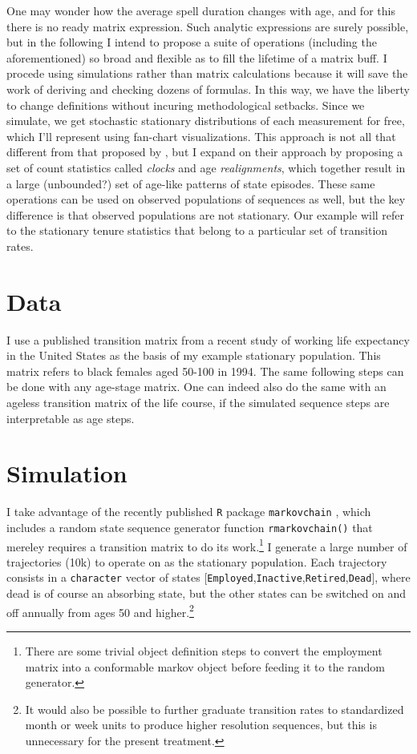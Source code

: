 \documentclass{article}
\begin{document}
One may wonder how the average spell duration changes with age, and for this
there is no ready matrix expression. Such analytic expressions are surely
possible, but in the following I intend to propose a suite of operations
(including the aforementioned) so broad and flexible as to fill the lifetime of
a matrix buff.
I procede using simulations rather than matrix calculations because it will
save the work of deriving and checking dozens of formulas. In this way, we have
the liberty to change definitions without incuring methodological setbacks.
Since we simulate, we get stochastic stationary distributions of each
measurement for free, which I'll represent using fan-chart visualizations. This
approach is not all that different from that proposed by \citet{laditka1998new},
but I expand on their approach by
proposing a set of count statistics called \emph{clocks} and age
\emph{realignments}, which together result in a large (unbounded?) set of
age-like patterns of state episodes. These same operations can be used
on observed populations of sequences as well, but the key difference
is that observed populations are not stationary. Our example will refer to the
stationary tenure statistics that belong to a particular set of transition
rates.

\section{Data}
I use a published transition matrix from a recent
study of working life expectancy in the United States \citep{Dudel2017} as the
basis of my example stationary population.
This matrix refers to black females aged 50-100 in 1994. The same following
steps can be done with any age-stage matrix. One can indeed also do the same with
an ageless transition matrix of the life course, if the simulated sequence steps
are interpretable as age steps.

\section{Simulation}
I take advantage of the recently published \texttt{R} package
\texttt{markovchain} \citep{spedicato2017}, which includes a random state
sequence generator function \texttt{rmarkovchain()} that mereley requires a
transition matrix to do its work.\footnote{There are some trivial object
definition steps to convert the employment matrix into a conformable markov
object before feeding it to the random generator.} I generate a large number of
trajectories (10k) to operate on as the stationary population. Each
trajectory consists in a \texttt{character} vector of states
[\texttt{Employed},\texttt{Inactive},\texttt{Retired},\texttt{Dead}], where dead
is of course an absorbing state, but the other states can be switched on and off
annually from ages 50 and higher.\footnote{It would also be possible to further
graduate transition rates to standardized month or week units to produce higher
resolution sequences, but this is unnecessary for the present treatment.}
\end{document}
